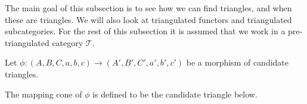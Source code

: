      The main goal of this subsection is to see how we can find  triangles, and when these are triangles. We will also look at triangulated functors and triangulated subcategories. For the rest of this subsection it is assumed that we work in a pre-triangulated category $\mathcal{T}$.

    \begin{definition}
        Let $\phi : (A,B,C,a,b,c) \rightarrow (A',B',C',a',b',c')$ be a morphism of candidate triangles.
        \begin{center}
        \end{center}
        The mapping cone of $\phi$ is defined to be the candidate triangle below.
        \begin{center}
        \end{center}
    \end{definition}

